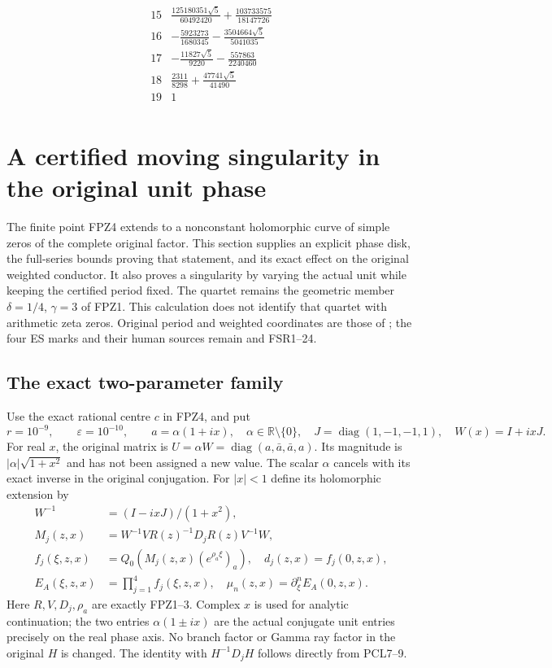 \documentclass[11pt]{article}
\begin{document}
\[
\begin{array}{c|l}
15&\frac{125180351 \sqrt{5}}{60492420} + \frac{103733575}{18147726}\\
16&- \frac{5923273}{1680345} - \frac{3504664 \sqrt{5}}{5041035}\\
17&- \frac{11827 \sqrt{5}}{9220} - \frac{557863}{2240460}\\
18&\frac{2311}{8298} + \frac{47741 \sqrt{5}}{41490}\\
19&1\\
\end{array}
\tag{ANP32}
\]

\section{A certified moving singularity in the original unit phase}
\label{sec:unit-phase-persistence}
The finite point FPZ4 extends to a nonconstant holomorphic curve of
simple zeros of the complete original factor. This section supplies an
explicit phase disk, the full-series bounds proving that statement,
and its exact effect on the original weighted conductor. It also
proves a singularity by varying the actual unit while keeping the
certified period fixed. The quartet remains the geometric member
$\delta=1/4$, $\gamma=3$ of FPZ1. This calculation does not identify
that quartet with arithmetic zeta zeros. Original period and weighted
coordinates are those of \cite{PCLOriginal,WCF}; the four ES marks
and their human sources remain \cite{ES488} and FSR1--24.

\subsection{The exact two-parameter family}
Use the exact rational centre $c$ in FPZ4, and put
\[
 r=10^{-9},\qquad \varepsilon=10^{-10},\qquad
 a=\alpha(1+ix),\quad \alpha\in\mathbb R\setminus\{0\},
 \quad J=\operatorname{diag}(1,-1,-1,1),\quad W(x)=I+ixJ.
 \tag{UPP1}
\]
For real $x$, the original matrix is
$U=\alpha W=\operatorname{diag}(a,\bar a,\bar a,a)$.
Its magnitude is $|\alpha|\sqrt{1+x^2}$ and has not been assigned
a new value. The scalar $\alpha$ cancels with its exact inverse in
the original conjugation. For $|x|<1$ define its holomorphic extension by
\[
 \begin{aligned}
 W^{-1}&=(I-ixJ)/(1+x^2),\\
 M_j(z,x)&=W^{-1}V R(z)^{-1}D_jR(z)V^{-1}W,\\
 f_j(\xi,z,x)&=Q_0(M_j(z,x)(e^{\rho_a\xi})_a),\quad
 d_j(z,x)=f_j(0,z,x),\\
 E_A(\xi,z,x)&=\prod_{j=1}^4 f_j(\xi,z,x),\quad
 \mu_n(z,x)=\partial_\xi^n E_A(0,z,x).
 \end{aligned}\tag{UPP2}
\]
Here $R,V,D_j,\rho_a$ are exactly FPZ1--3. Complex $x$ is used
for analytic continuation; the two entries $\alpha(1\pm ix)$ are
the actual conjugate unit entries precisely on the real phase axis.
No branch factor or Gamma ray factor in the original $H$ is changed.
The identity with $H^{-1}D_jH$ follows directly from PCL7--9.
\end{document}
